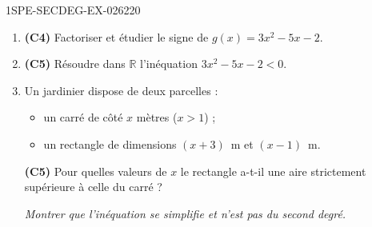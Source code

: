 \begin{exercice}{1SPE-SECDEG-EX-026}{2}{20}
\begin{enumerate}
  \item \textbf{(C4)} Factoriser et étudier le signe de $g(x) = 3x^2 - 5x - 2$.
  \item \textbf{(C5)} Résoudre dans $\mathbb{R}$ l'inéquation $3x^2 - 5x - 2 < 0$.

  \item Un jardinier dispose de deux parcelles :
  \begin{itemize}
    \item un carré de côté $x$ mètres ($x > 1$) ;
    \item un rectangle de dimensions $(x+3)$~m et $(x-1)$~m.
  \end{itemize}
  \textbf{(C5)} Pour quelles valeurs de $x$ le rectangle a-t-il une aire strictement supérieure à celle du carré ?

  \textit{Montrer que l'inéquation se simplifie et n'est pas du second degré.}
\end{enumerate}
\end{exercice}
